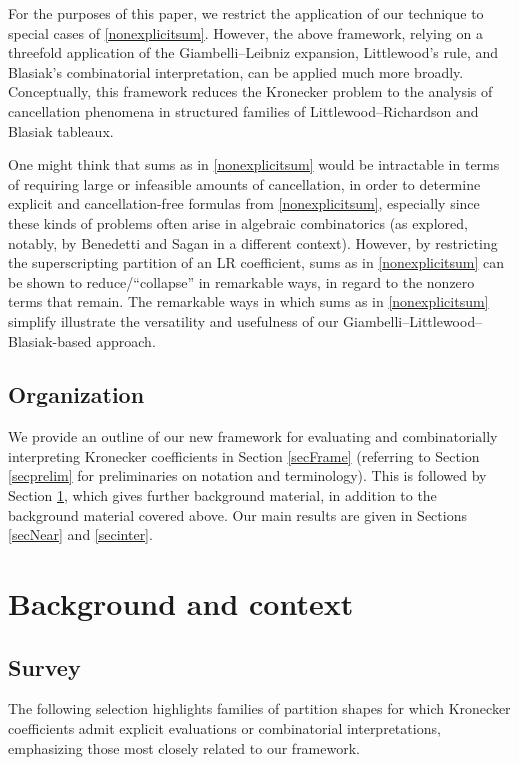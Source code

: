 \documentclass[12pt]{article}
\begin{document}
 For the purposes of this paper, we restrict the application of our technique to special cases of \eqref{nonexplicitsum}. However, the 
 above framework, relying on a threefold application of the Giambelli--Leibniz expansion, Littlewood's rule, and Blasiak's combinatorial 
 interpretation, can be applied much more broadly. Conceptually, this framework reduces the Kronecker problem to the analysis of 
 cancellation phenomena in structured families of Littlewood--Richardson and Blasiak tableaux.

 One might think that sums as in \eqref{nonexplicitsum} would be intractable in terms of requiring large or infeasible amounts of 
 cancellation, in order to determine explicit and cancellation-free formulas from \eqref{nonexplicitsum}, especially since these kinds of 
 problems often arise in algebraic combinatorics (as explored, notably, by Benedetti and Sagan \cite{BenedettiSagan2017} in a different 
 context). However, by restricting the superscripting partition of an LR coefficient, sums as in \eqref{nonexplicitsum} can be shown to 
 reduce/``collapse'' in remarkable ways, in regard to the nonzero terms that remain. 
 The remarkable ways in which sums as in \eqref{nonexplicitsum} simplify illustrate the 
 versatility and usefulness of our Giambelli--Littlewood--Blasiak-based approach. 

\subsection{Organization}
 We provide an outline of our new framework for evaluating and combinatorially interpreting Kronecker coefficients in Section 
 \ref{secFrame} (referring to Section \ref{secprelim} for preliminaries on notation and terminology). This is followed by Section 
 \ref{secBack}, which gives further background material, in addition to the background material covered above. 
 Our main results are given in Sections \ref{secNear} and \ref{secinter}. 

\section{Background and context}\label{secBack}

\subsection{Survey}\label{secSurvey}
 The following selection highlights families of partition shapes for which Kronecker coefficients admit explicit evaluations or combinatorial 
 interpretations, emphasizing those most closely related to our framework.
\end{document}
